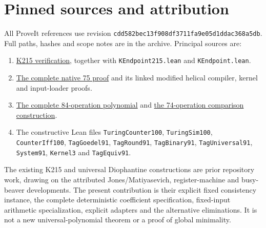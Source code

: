 \documentclass[10pt]{article}
\newcommand{\code}[1]{\texttt{#1}}
\begin{document}
\section*{Pinned sources and attribution}
All ProveIt references use revision \code{cdd582bec13f908df3711fa9e05d1ddac368a5db}. Full paths, hashes and scope notes are in the archive. Principal sources are:
\begin{enumerate}
\item \href{https://github.com/VladimirReshetnikov/ProveIt/tree/cdd582bec13f908df3711fa9e05d1ddac368a5db/Computability/BusyBeaver/Research/ZFC/k225-formal/verification/k215}{K215 verification}, together with \code{KEndpoint215.lean} and \code{KEndpoint.lean}.
\item \href{https://github.com/VladimirReshetnikov/ProveIt/blob/cdd582bec13f908df3711fa9e05d1ddac368a5db/Computability/HilbertTenthProblem/Papers/1980/FIXED_RAW_UNIVERSAL_75_PROOF.md}{The complete native 75 proof} and its linked modified helical compiler, kernel and input-loader proofs.
\item \href{https://github.com/VladimirReshetnikov/ProveIt/blob/cdd582bec13f908df3711fa9e05d1ddac368a5db/Computability/HilbertTenthProblem/Papers/research-wip/native-stream-queue/complete84_scaled_strong_output.md}{The complete 84-operation polynomial} and \href{https://github.com/VladimirReshetnikov/ProveIt/blob/cdd582bec13f908df3711fa9e05d1ddac368a5db/Computability/HilbertTenthProblem/Papers/research-wip/native-stream-queue/complete74_factored_first_norm.md}{the 74-operation comparison construction}.
\item The constructive Lean files \code{TuringCounter100}, \code{TuringSim100}, \code{CounterIff100}, \code{TagGoedel91}, \code{TagRound91}, \code{TagBinary91}, \code{TagUniversal91}, \code{System91}, \code{Kernel3} and \code{TagEquiv91}.
\end{enumerate}
The existing K215 and universal Diophantine constructions are prior repository work, drawing on the attributed Jones/Matiyasevich, register-machine and busy-beaver developments. The present contribution is their explicit fixed consistency instance, the complete deterministic coefficient specification, fixed-input arithmetic specialization, explicit adapters and the alternative eliminations. It is not a new universal-polynomial theorem or a proof of global minimality.
\end{document}
